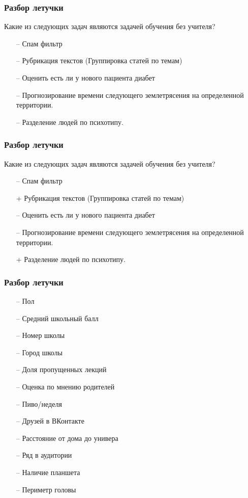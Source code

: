 \documentclass[12pt]{beamer}
\begin{document}
\begin{frame}\frametitle{Разбор летучки}
Какие из следующих задач являются задачей обучения без учителя?
\begin{itemize}
	\item[--] Спам фильтр
	\item[--] Рубрикация текстов (Группировка статей по темам)
	\item[--] Оценить есть ли у нового пациента диабет
	\item[--] Прогнозирование времени следующего землетрясения на определенной территории.
	\item[--] Разделение людей по психотипу. 
\end{itemize}
\end{frame}

\begin{frame}\frametitle{Разбор летучки}
Какие из следующих задач являются задачей обучения без учителя?
\begin{itemize}
	\item[--] Спам фильтр
	\item[+] Рубрикация текстов (Группировка статей по темам)
	\item[--] Оценить есть ли у нового пациента диабет
	\item[--] Прогнозирование времени следующего землетрясения на определенной территории.
	\item[+] Разделение людей по психотипу. 
\end{itemize}
\end{frame}

\begin{frame}\frametitle{Разбор летучки}
\begin{itemize}
\item[--] Пол
\item[--] Средний школьный балл
\item[--] Номер школы
\item[--] Город школы
\item[--] Доля пропущенных лекций
\item[--] Оценка по мнению родителей
\item[--] Пиво/неделя
\item[--] Друзей в ВКонтакте
\item[--] Расстояние от дома до универа
\item[--] Ряд в аудитории
\item[--] Наличие планшета
\item[--] Периметр головы
\end{itemize}
\end{frame}
\end{document}
